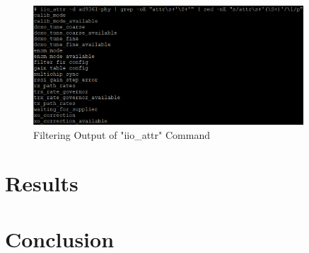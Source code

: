\documentclass{article}
\begin{document}
\begin{figure}[H]
	\centerline{\includegraphics[width=0.9\textwidth]{iio_filtered_attributes.png}}
	\caption{Filtering Output of "iio\_attr" Command}
	\label{fig::iio_filtered_attributes}
\end{figure}

\section{Results}

\section{Conclusion}

\nocite{analog_devices_libiio_error}

{}
%
	
\end{document}
